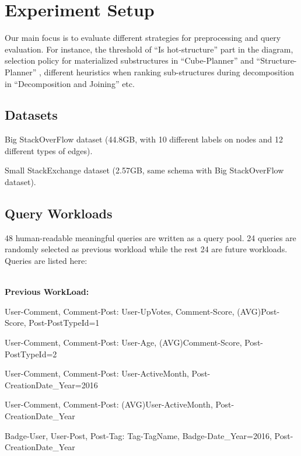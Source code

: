 
\section{Experiment Setup}

Our main focus is to evaluate different strategies for preprocessing and query evaluation. For instance, the threshold of “Is hot-structure” part in the diagram,  selection policy for materialized substructures in “Cube-Planner” and “Structure-Planner” , different heuristics when ranking sub-structures during decomposition in “Decomposition and Joining” etc.

\subsection{Datasets}

Big StackOverFlow dataset (44.8GB, with 10 different labels on nodes and 12 different types of edges).

Small StackExchange dataset (2.57GB, same schema with Big StackOverFlow dataset).


\subsection{Query Workloads}
48 human-readable meaningful queries are written as a query pool. 24 queries are randomly selected as previous workload while the rest 24 are  future workloads. Queries are listed here:

\\ \textbf{Previous WorkLoad:}

User-Comment, Comment-Post: User-UpVotes, Comment-Score, (AVG)Post-Score, Post-PostTypeId=1

User-Comment, Comment-Post: User-Age, (AVG)Comment-Score, Post-PostTypeId=2

User-Comment, Comment-Post: User-ActiveMonth, Post-CreationDate\_Year=2016

User-Comment, Comment-Post: (AVG)User-ActiveMonth, Post-CreationDate\_Year

Badge-User, User-Post, Post-Tag: Tag-TagName, Badge-Date\_Year=2016, Post-CreationDate\_Year

